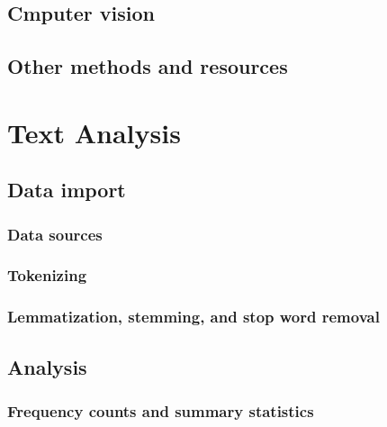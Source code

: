 \documentclass[
]{book}
\begin{document}
\hypertarget{cmputer-vision}{%
\section{Cmputer vision}\label{cmputer-vision}}

\hypertarget{other-methods-and-resources}{%
\section{Other methods and resources}\label{other-methods-and-resources}}

\hypertarget{text_analysis}{%
\chapter{Text Analysis}\label{text_analysis}}

\hypertarget{data-import}{%
\section{Data import}\label{data-import}}

\hypertarget{data-sources}{%
\subsection{Data sources}\label{data-sources}}

\hypertarget{tokenizing}{%
\subsection{Tokenizing}\label{tokenizing}}

\hypertarget{lemmatization-stemming-and-stop-word-removal}{%
\subsection{Lemmatization, stemming, and stop word removal}\label{lemmatization-stemming-and-stop-word-removal}}

\hypertarget{analysis}{%
\section{Analysis}\label{analysis}}

\hypertarget{frequency-counts-and-summary-statistics}{%
\subsection{Frequency counts and summary statistics}\label{frequency-counts-and-summary-statistics}}
\end{document}
